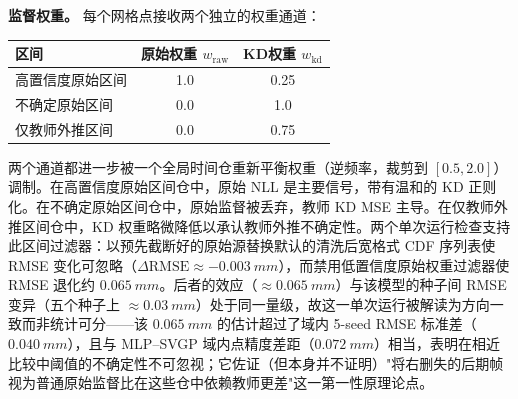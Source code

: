 \textbf{监督权重。} 每个网格点接收两个独立的权重通道：

\begin{center}
\footnotesize
\begin{tabular}{lcc}
\toprule
区间 & 原始权重 $w_{\mathrm{raw}}$ & KD权重 $w_{\mathrm{kd}}$ \\
\midrule
高置信度原始区间  & 1.0 & 0.25 \\
不确定原始区间 & 0.0 & 1.0  \\
仅教师外推区间  & 0.0 & 0.75 \\
\bottomrule
\end{tabular}
\end{center}

两个通道都进一步被一个全局时间仓重新平衡权重（逆频率，裁剪到 \([0.5,2.0]\)）调制。在高置信度原始区间仓中，原始 NLL 是主要信号，带有温和的 KD 正则化。在不确定原始区间仓中，原始监督被丢弃，教师 KD MSE 主导。在仅教师外推区间仓中，KD 权重略微降低以承认教师外推不确定性。两个单次运行检查支持此区间过滤器：以预先截断好的原始源替换默认的清洗后宽格式 CDF 序列表使 RMSE 变化可忽略（\(\Delta\mathrm{RMSE}\approx-\SI{0.003}{mm}\)），而禁用低置信度原始权重过滤器使 RMSE 退化约 \(\SI{0.065}{mm}\)。后者的效应（\(\approx\SI{0.065}{mm}\)）与该模型的种子间 RMSE 变异（五个种子上 \(\approx\SI{0.03}{mm}\)）处于同一量级，故这一单次运行被解读为方向一致而非统计可分——该 \(\SI{0.065}{mm}\) 的估计超过了域内 5-seed RMSE 标准差（\(\SI{0.040}{mm}\)），且与 MLP--SVGP 域内点精度差距（\(\SI{0.072}{mm}\)）相当，表明在相近比较中阈值的不确定性不可忽视；它佐证（但本身并不证明）"将右删失的后期帧视为普通原始监督比在这些仓中依赖教师更差"这一第一性原理论点。

